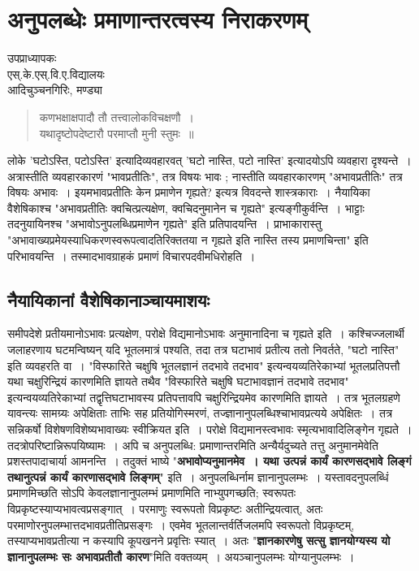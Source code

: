 {\fontsize{15}{17}\selectfont
\chapter{अनुपलब्धेः प्रमाणान्तरत्वस्य निराकरणम्}

\begin{center}
\smallskip

उपप्राध्यापकः\\
एस्.के.एस्.वि.ए.विद्यालयः\\
आदिचुञ्चनगिरिः, मण्ड्या
\addrule
\end{center}

\begin{verse}
कणभक्षाक्षपादौ तौ तत्त्वालोकविचक्षणौ~। \\
यथादृष्टोपदेष्टारौ परमाप्तौ मुनी स्तुमः~॥
\end{verse}
लोके  'घटोऽस्ति, पटोऽस्ति' इत्यादिव्यवहारवत् 'घटो नास्ति, पटो नास्ति' इत्यादयोऽपि व्यवहारा दृश्यन्ते~। अत्रास्तीति व्यवहारकारणं "भावप्रतीतिः", तत्र विषयः भावः ; नास्तीति व्यवहारकारणम् "अभावप्रतीतिः" तत्र विषयः अभावः~। इयमभावप्रतीतिः केन प्रमाणेन गृह्यते? इत्यत्र विवदन्ते शास्त्रकाराः~। नैयायिका वैशेषिकाश्च "अभावप्रतीतिः क्वचित्प्रत्यक्षेण, क्वचिदनुमानेन च गृह्यते" इत्यङ्गीकुर्वन्ति~। भाट्टाः तदनुयायिनश्च "अभावोऽनुपलब्धिप्रमाणेन गृह्यते" इति प्रतिपादयन्ति~। प्राभाकारास्तु "अभावाख्यप्रमेयस्याधिकरणस्वरूपत्वादतिरिक्ततया न गृह्यते इति नास्ति तस्य प्रमाणचिन्ता" इति परिभावयन्ति~। तस्मादभावग्राहकं प्रमाणं विचारपदवीमधिरोहति~। 
 
\section*{नैयायिकानां वैशेषिकानाञ्चायमाशयः} 

समीपदेशे प्रतीयमानोऽभावः प्रत्यक्षेण, परोक्षे विद्यमानोऽभावः अनुमानादिना च गृह्यते इति~। कश्चिज्जलार्थी जलाहरणाय घटमन्विष्यन् यदि भूतलमात्रं पश्यति, तदा तत्र घटाभावं प्रतीत्य ततो निवर्तते, "घटो नास्ति" इति व्यवहरति वा~। "विस्फारिते चक्षुषि भूतलज्ञानं तदभावे तदभाव" इत्यन्वयव्यतिरेकाभ्यां भूतलप्रतिपत्तौ यथा चक्षुरिन्द्रियं कारणमिति ज्ञायते तथैव "विस्फारिते चक्षुषि घटाभावज्ञानं तदभावे तदभाव" इत्यन्वयव्यतिरेकाभ्यां तद्वृत्तिघटाभावस्य प्रतिपत्तावपि चक्षुरिन्द्रियमेव कारणमिति ज्ञायते~। तत्र भूतलग्रहणे यावन्त्यः सामग्र्यः अपेक्षिताः ताभिः सह प्रतियोगिस्मरणं, तज्ज्ञानानुपलब्धिश्चाभावप्रत्यये अपेक्षितः~। तत्र सन्निकर्षो विशेषणविशेष्यभावाख्यः स्वीक्रियत इति~। परोक्षे विद्यमानस्त्वभावः स्मृत्यभावादिलिङ्गेन गृह्यते~। तदत्रोपरिष्टान्निरूपयिष्यामः~। अपि च अनुपलब्धि: प्रमाणान्तरमिति अन्यैर्यदुच्यते तत्तु अनुमानमेवेति प्रशस्तपादाचार्या आमनन्ति~। तदुक्तं भाष्ये "\textbf{अभावोप्यनुमानमेव~। यथा उत्पन्नं कार्यं कारणसद्भावे लिङ्गं तथानुत्पन्नं कार्यं कारणासद्भावे लिङ्गम्}" इति~। अनुपलब्धिर्नाम ज्ञानानुपलम्भः~। यस्तावदनुपलब्धिं प्रमाणमिच्छति सोऽपि केवलज्ञानानुपलम्भं प्रमाणमिति नाभ्युपगच्छति; स्वरूपतः विप्रकृष्टस्याप्यभावत्वप्रसङ्गात्~। परमाणुः स्वरूपतो विप्रकृष्टः अतीन्द्रियत्वात्, अतः परमाणोरनुपलम्भात्तदभावप्रतीतिप्रसङ्गः~। एवमेव भूतलान्तर्वर्तिजलमपि स्वरूपतो विप्रकृष्टम्, तस्याप्यभावप्रतीत्या न कस्यापि कूपखनने प्रवृत्तिः स्यात्~। अतः "\textbf{ज्ञानकारणेषु सत्सु ज्ञानयोग्यस्य यो ज्ञानानुपलम्भः सः अभावप्रतीतौ कारण}"मिति वक्तव्यम्~। अयञ्चानुपलम्भः योग्यानुपलम्भः~। 

}
